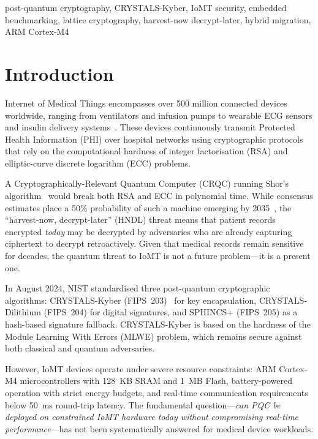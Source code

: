 \documentclass[10pt,journal,compsoc]{IEEEtran}
\begin{document}
\begin{IEEEkeywords}
post-quantum cryptography, CRYSTALS-Kyber, IoMT security,
embedded benchmarking, lattice cryptography, harvest-now decrypt-later,
hybrid migration, ARM Cortex-M4
\end{IEEEkeywords}

\section{Introduction}
\label{sec:intro}

 Internet of Medical Things encompasses over
500 million connected devices worldwide, ranging from ventilators and
infusion pumps to wearable ECG sensors and insulin delivery
systems~\cite{statista2024iomt}.
These devices continuously transmit Protected Health Information (PHI)
over hospital networks using cryptographic protocols that rely on
the computational hardness of integer factorisation (RSA) and
elliptic-curve discrete logarithm (ECC) problems.

A Cryptographically-Relevant Quantum Computer (CRQC) running
Shor's algorithm~\cite{shor1994} would break both RSA and ECC in
polynomial time.
While consensus estimates place a 50\% probability of such a
machine emerging by 2035~\cite{mosca2018,ibm2023roadmap},
the ``harvest-now, decrypt-later'' (HNDL) threat means that
patient records encrypted \emph{today} may be decrypted by adversaries
who are already capturing ciphertext to decrypt retroactively.
Given that medical records remain sensitive for decades, the
quantum threat to IoMT is not a future problem---it is a present one.

In August 2024, NIST standardised three post-quantum cryptographic
algorithms: CRYSTALS-Kyber (FIPS~203)~\cite{nistfips203} for key
encapsulation, CRYSTALS-Dilithium (FIPS~204) for digital signatures,
and SPHINCS+ (FIPS~205) as a hash-based signature fallback.
CRYSTALS-Kyber is based on the hardness of the Module Learning
With Errors (MLWE) problem, which remains secure against both
classical and quantum adversaries.

However, IoMT devices operate under severe resource constraints:
ARM Cortex-M4 microcontrollers with 128~KB SRAM and 1~MB Flash,
battery-powered operation with strict energy budgets, and real-time
communication requirements below 50~ms round-trip latency.
The fundamental question---\emph{can PQC be deployed on constrained
IoMT hardware today without compromising real-time performance}---has
not been systematically answered for medical device workloads.
\end{document}
